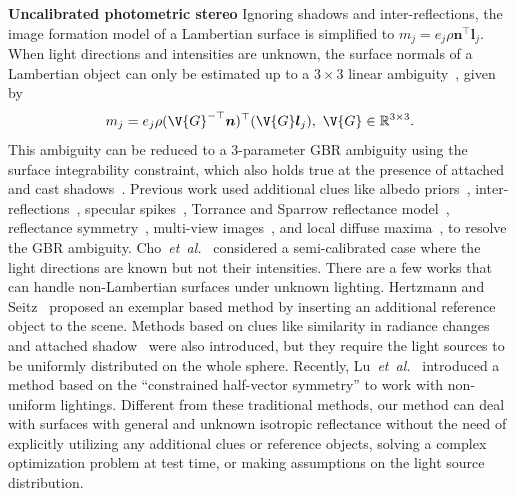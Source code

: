 \documentclass[10pt,journal,compsoc]{IEEEtran}
\newcommand{\etal}{\textit{et~al.}}
\newcommand{\vn}{\boldsymbol{n}}
\newcommand{\vl}{\boldsymbol{l}}
\newcommand{\rev}[1]{#1}
\renewcommand{\paragraph}[1]{\vspace{0.2em}\noindent \textbf{#1 \hspace{0.2em}}}
\begin{document}
\paragraph{Uncalibrated photometric stereo}
\rev{Ignoring shadows and inter-reflections, the image formation model of a Lambertian surface is simplified to $m_j = e_j \rho \vn^\top \vl_j$. When light directions and intensities are unknown, the surface normals of a Lambertian object can only be estimated up to a $3\times 3$ linear ambiguity~\cite{hayakawa1994photometric}, given by 
\begin{equation}
    m_j = e_j\rho (\V{G}^{-\top} \vn)^\top (\V{G}\vl_j),\,\, \V{G} \in \mathbb{R}^{3\times 3}.
    \label{eq:gbr}
\end{equation}
This ambiguity can be reduced to a $3$-parameter GBR ambiguity using the surface integrability constraint, which also holds true at the presence of attached and cast shadows~\cite{belhumeur1999bas,yuille1999determining}.}
Previous work used additional clues like albedo priors~\cite{alldrin2007r,shi2010self}, inter-reflections~\cite{chandraker2005reflections}, specular spikes~\cite{drbohlav2005can}, Torrance and Sparrow reflectance model~\cite{georghiades2003incorporating}, reflectance symmetry~\cite{tan2007isotropy,wu2013calib}, multi-view images~\cite{esteban2008multiview}, and local diffuse maxima~\cite{papad14closed}, to resolve the GBR ambiguity. Cho~\etal~\cite{cho2016photometric} considered a semi-calibrated case where the light directions are known but not their intensities. There are a few works that can handle non-Lambertian surfaces under unknown lighting. Hertzmann and Seitz~\cite{hertzmann2005example} proposed an exemplar based method by inserting an additional reference object to the scene. Methods based on clues like similarity in radiance changes~\cite{sato2007shape,lu2013uncalibrated} and attached shadow~\cite{okabe2009attached} were also introduced, but they require the light sources to be uniformly distributed on the whole sphere. Recently, Lu~\etal~\cite{lu2018symps} introduced a method based on the ``constrained half-vector symmetry'' to work with non-uniform lightings. Different from these traditional methods, our method can deal with surfaces with general and unknown isotropic reflectance without the need of explicitly utilizing any additional clues or reference objects, solving a complex optimization problem at test time, or making assumptions on the light source distribution. 
\end{document}
